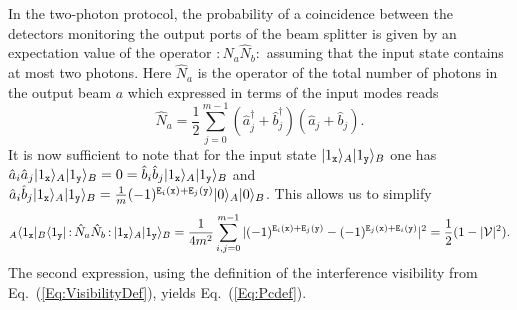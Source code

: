 \documentclass[10pt]{article}
\newcommand{\ket}[2][]{{|#2\rangle_{#1}}}
\newcommand{\bra}[2][]{{}_{#1}\langle #2|}
\begin{document}
In the two-photon protocol, the probability of a coincidence between the detectors monitoring the output ports of the beam splitter is given by an expectation value of the operator $\mathop{:} \hat{N}_{a} \hat{N}_{b} \mathop{:} $ assuming that the input state contains at most two photons. Here $\hat{N}_a$ is the operator of the total number of photons in the output beam $a$ which expressed in terms of the input modes reads
\begin{equation}
\hat{N}_a = \frac{1}{2} \sum_{j=0}^{m-1} (\hat{a}_j^\dagger + \hat{b}_{j}^\dagger)(\hat{a}_j + \hat{b}_{j}  ) .
\end{equation}
It is now sufficient to note that for the input state $\ket[A]{1_{\tt x}}\ket[B]{1_{\tt y}}$ one has $\hat{a}_i \hat{a}_j \ket[A]{1_{\tt x}}\ket[B]{1_{\tt y}} = 0 = \hat{b}_i \hat{b}_j \ket[A]{1_{\tt x}}\ket[B]{1_{\tt y}}$ and
$\hat{a}_i \hat{b}_j \ket[A]{1_{\tt x}}\ket[B]{1_{\tt y}} = \frac{1}{m}(-1)^{{\tt E}_i({\tt x}) + {\tt E}_j({\tt y})} \ket[A]{0} \ket[B]{0}$. This allows us to simplify
\begin{equation}
\bra[A]{1_{\tt x}}\bra[B]{1_{\tt y}} \mathop{:} \hat{N}_{a} \hat{N}_{b} \mathop{:} \ket[A]{1_{\tt x}}\ket[B]{1_{\tt y}}
= \frac{1}{4m^2} \sum_{i,j=0}^{m-1} | (-1)^{{\tt E}_i({\tt x}) + {\tt E}_j({\tt y})}
- (-1)^{{\tt E}_j({\tt x}) + {\tt E}_i({\tt y})}|^2 = \frac{1}{2} (1- |{\cal V}|^2).
\end{equation}
The second expression, using the definition of the interference visibility from Eq.~(\ref{Eq:VisibilityDef}), yields Eq.~(\ref{Eq:Pcdef}).
\end{document}
